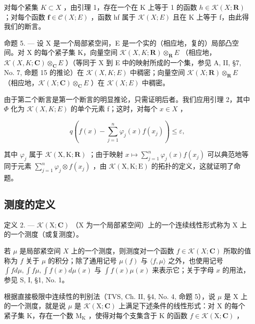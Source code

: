 对每个紧集 \(K \subset X\) ，由引理 1，存在一个在 K 上等于 1 的函数 \(h \in \mathcal{K}(X; \mathbf{R})\) ；对每个函数 \(\mathbf{f} \in \mathcal{C}(X; E)\) ，函数 hf 属于 \(\mathcal{K}(X; E)\) 且在 K 上等于 f，由此得我们的断言。

命题 5. --- 设 X 是一个局部紧空间，E 是一个实的（相应地，复的）局部凸空间。对 X 的每个紧子集 K，向量空间 \(\mathcal{K}(X,K;\mathbf{R})\otimes_{\mathbf{R}}E\) （相应地，\(\mathcal{K}(X,K;\mathbf{C})\otimes_{\mathbf{C}}E\) ）（等同于 X 到 E 中的映射所成的一个集，参见 A, II, §7, No. 7, 命题 15 的推论）在 \(\mathcal{K}(X,K;E)\) 中稠密；向量空间 \(\mathcal{K}(X;\mathbf{R})\otimes_{\mathbf{R}}E\) （相应地，\(\mathcal{K}(X;\mathbf{C})\otimes_{\mathbf{C}}E\) ）在 \(\mathcal{K}(X;E)\) 中稠密。

由于第二个断言是第一个断言的明显推论，只需证明后者。我们应用引理 2，其中 \(\Phi\) 化为 \(\mathcal{K}(X,K;E)\) 的单个元素 f；这时，对每个 \(x\in X\) ，

\[
q \left(f (x) - \sum_ {j = 1} ^ {n} \varphi_ {j} (x) f \left(x _ {j}\right)\right) \leqslant \varepsilon ,
\]

其中 \(\varphi_{j}\) 属于 \(\mathcal{K}(\mathrm{X},\mathrm{K};\mathbf{R})\) ；由于映射 \(x\mapsto \sum_{j = 1}^{n}\varphi_{j}(x)f(x_{j})\) 可以典范地等同于元素 \(\sum_{j = 1}^{n}\varphi_{j}\otimes f(x_{j})\) ，由 \(\mathcal{K}(\mathrm{X},\mathrm{K};\mathrm{E})\) 的拓扑的定义，这就证明了命题。

\subsection{测度的定义}

定义 2. --- \(\mathcal{K}(\mathrm{X};\mathbf{C})\) （\(\mathrm{X}\) 为一个局部紧空间）上的一个连续线性形式称为 \(\mathrm{X}\) 上的一个测度（或复测度）。

若 \(\mu\) 是局部紧空间 \(X\) 上的一个测度，则测度对一个函数 \(f \in \mathcal{K}(X; \mathbf{C})\) 所取的值称为 \(f\) 关于 \(\mu\) 的积分；除了通用记号 \(\mu(f)\) 与 \(\langle f, \mu \rangle\) 之外，也使用记号 \(\int f d\mu, \int f\mu, \int f(x) d\mu(x)\) 与 \(\int f(x)\mu(x)\) 来表示它；关于字母 \(x\) 的用法，参见 S, I, §1, No. 1。

根据直接极限中连续性的判别法（TVS, Ch. II, §4, No. 4, 命题 5），说 \(\mu\) 是 X 上的一个测度，就是说 \(\mu\) 是 \(\mathcal{K}(\mathrm{X};\mathbf{C})\) 上满足下述条件的线性形式：对 X 的每个紧子集 K，存在一个数 \(\mathrm{M_K}\) ，使得对每个支集含于 K 的函数 \(f\in \mathcal{K}(\mathrm{X};\mathbf{C})\) ，

